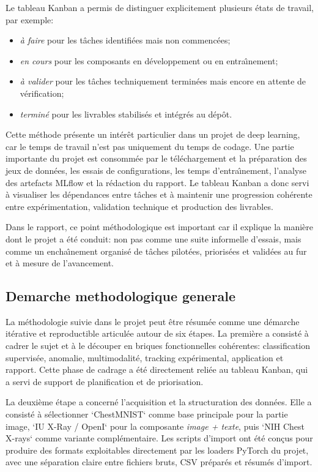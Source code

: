 \documentclass[11pt,a4paper]{article}
\begin{document}
Le tableau Kanban a permis de distinguer explicitement plusieurs \'etats de travail, par exemple:
\begin{itemize}
    \item \emph{\`a faire} pour les t\^aches identifi\'ees mais non commenc\'ees;
    \item \emph{en cours} pour les composants en d\'eveloppement ou en entra\^\i nement;
    \item \emph{\`a valider} pour les t\^aches techniquement termin\'ees mais encore en attente de v\'erification;
    \item \emph{termin\'e} pour les livrables stabilis\'es et int\'egr\'es au d\'ep\^ot.
\end{itemize}

Cette m\'ethode pr\'esente un int\'er\^et particulier dans un projet de deep learning, car le temps de travail n'est pas uniquement du temps de codage. Une partie importante du projet est consomm\'ee par le t\'el\'echargement et la pr\'eparation des jeux de donn\'ees, les essais de configurations, les temps d'entra\^\i nement, l'analyse des artefacts MLflow et la r\'edaction du rapport. Le tableau Kanban a donc servi \`a visualiser les d\'ependances entre t\^aches et \`a maintenir une progression coh\'erente entre exp\'erimentation, validation technique et production des livrables.

Dans le rapport, ce point m\'ethodologique est important car il explique la mani\`ere dont le projet a \'et\'e conduit: non pas comme une suite informelle d'essais, mais comme un encha\^\i nement organis\'e de t\^aches pilot\'ees, prioris\'ees et valid\'ees au fur et \`a mesure de l'avancement.

\subsection{Demarche methodologique generale}
La m\'ethodologie suivie dans le projet peut \^etre r\'esum\'ee comme une d\'emarche it\'erative et reproductible articul\'ee autour de six \'etapes. La premi\`ere a consist\'e \`a cadrer le sujet et \`a le d\'ecouper en briques fonctionnelles coh\'erentes: classification supervis\'ee, anomalie, multimodalit\'e, tracking exp\'erimental, application et rapport. Cette phase de cadrage a \'et\'e directement reli\'ee au tableau Kanban, qui a servi de support de planification et de priorisation.

La deuxi\`eme \'etape a concern\'e l'acquisition et la structuration des donn\'ees. Elle a consist\'e \`a s\'electionner `ChestMNIST` comme base principale pour la partie image, `IU X-Ray / OpenI` pour la composante \emph{image + texte}, puis `NIH Chest X-rays` comme variante compl\'ementaire. Les scripts d'import ont \'et\'e con\c{c}us pour produire des formats exploitables directement par les loaders PyTorch du projet, avec une s\'eparation claire entre fichiers bruts, CSV pr\'epar\'es et r\'esum\'es d'import.
\end{document}

